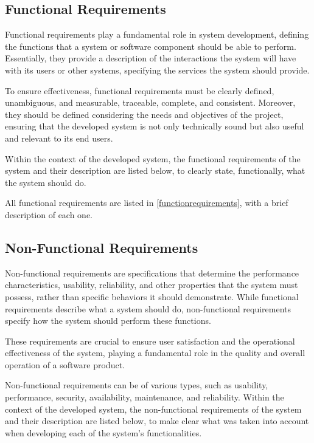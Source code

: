 \subsection[Functional Requirements]{Functional Requirements}
Functional requirements play a fundamental role in system development, defining the functions that a system or software component should be able to perform. Essentially, they provide a description of the interactions the system will have with its users or other systems, specifying the services the system should provide.

To ensure effectiveness, functional requirements must be clearly defined, unambiguous, and measurable, traceable, complete, and consistent. Moreover, they should be defined considering the needs and objectives of the project, ensuring that the developed system is not only technically sound but also useful and relevant to its end users.

Within the context of the developed system, the functional requirements of the system and their description are listed below, to clearly state, functionally, what the system should do.

All functional requirements are listed in \ref{functionrequirements}, with a brief description of each one.

\subsection[Non-Functional Requirements]{Non-Functional Requirements}\label{ssubec:reqNfuctional}
Non-functional requirements are specifications that determine the performance characteristics, usability, reliability, and other properties that the system must possess, rather than specific behaviors it should demonstrate. While functional requirements describe what a system should do, non-functional requirements specify how the system should perform these functions.

These requirements are crucial to ensure user satisfaction and the operational effectiveness of the system, playing a fundamental role in the quality and overall operation of a software product.

Non-functional requirements can be of various types, such as usability, performance, security, availability, maintenance, and reliability. Within the context of the developed system, the non-functional requirements of the system and their description are listed below, to make clear what was taken into account when developing each of the system's functionalities.

